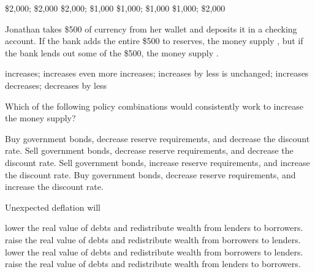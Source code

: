 \documentclass[addpoints,11pt]{exam}
\theoremstyle{definition}
\begin{document}
\begin{questions}
\begin{choices}
	\CorrectChoice \$2,000; \$2,000
	\choice \$2,000; \$1,000
	\choice \$1,000; \$1,000
	\choice \$1,000; \$2,000
\end{choices}



\question Jonathan takes \$500 of currency from her wallet and deposits it in a checking account. If the bank adds the entire \$500 to reserves, the money supply \underline{\hspace{3cm}}, but if the bank lends out some of the \$500, the money supply \underline{\hspace{3cm}}.


\begin{choices}
	\choice increases; increases even more
	\choice increases; increases by less
	\CorrectChoice is unchanged; increases
	\choice decreases; decreases by less
\end{choices}

\question Which of the following policy combinations would consistently work to increase the money supply?

\begin{choices}
	\CorrectChoice Buy government bonds, decrease reserve requirements, and decrease the discount rate.
	\choice Sell government bonds, decrease reserve requirements, and decrease the discount rate.
	\choice Sell government bonds, increase reserve requirements, and increase the discount rate.
	\choice Buy government bonds, decrease reserve requirements, and increase the discount rate.
\end{choices}


\newpage




\question Unexpected deflation will

\begin{choices}
	\choice lower the real value of debts and redistribute wealth from lenders to borrowers.
	\CorrectChoice raise the real value of debts and redistribute wealth from borrowers to lenders.
	\choice lower the real value of debts and redistribute wealth from borrowers to lenders.
	\choice raise the real value of debts and redistribute wealth from lenders to borrowers.
\end{choices}


\end{questions}
\end{document}

